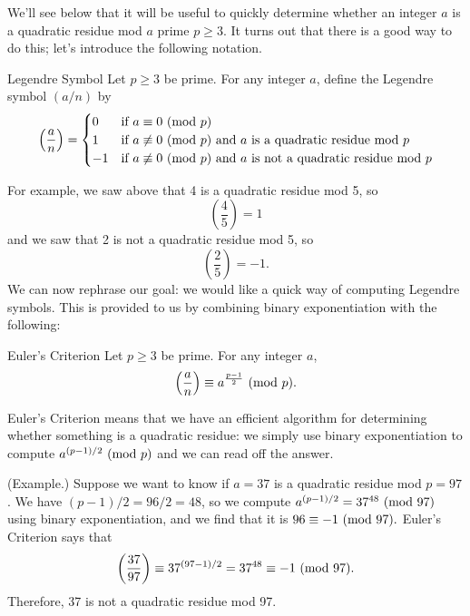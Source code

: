 \documentclass[letterpaper]{article}
\begin{document}
We'll see below that it will be useful to quickly determine whether an integer $a$ is a quadratic residue mod $a$ prime $p \geq 3$. It turns out that there is a good way to do this; let's introduce the following notation. 
\begin{definition}{Legendre Symbol}{}
    Let $p \geq 3$ be prime. For any integer $a$, define the Legendre symbol $(a/n)$ by 
    \[\left(\frac{a}{n}\right) = \begin{cases}
        0 & \text{if } a \equiv 0 \ (\mathrm{mod}\ p) \\ 
        1 & \text{if } a \not\equiv 0 \ (\mathrm{mod}\ p) \text{ and } a \text{ is a quadratic residue mod } p \\ 
        -1 & \text{if } a \not\equiv 0 \ (\mathrm{mod}\ p) \text{ and } a \text{ is not a quadratic residue mod } p
    \end{cases}\]
\end{definition}
For example, we saw above that 4 is a quadratic residue mod 5, so 
\[\left(\frac{4}{5}\right) = 1\]
and we saw that 2 is not a quadratic residue mod 5, so 
\[\left(\frac{2}{5}\right) = -1.\]
We can now rephrase our goal: we would like a quick way of computing Legendre symbols. This is provided to us by combining binary exponentiation with the following: 
\begin{lemma}{Euler's Criterion}{}
    Let $p \geq 3$ be prime. For any integer $a$, 
    \[\left(\frac{a}{n}\right) \equiv a^{\frac{p - 1}{2}} \ (\mathrm{mod}\ p).\]
\end{lemma}

Euler's Criterion means that we have an efficient algorithm for determining whether something is a quadratic residue: we simply use binary exponentiation to compute $a^{(p - 1) / 2} \ (\mathrm{mod}\ p)$ and we can read off the answer. 

\begin{mdframed}
    (Example.) Suppose we want to know if $a = 37$ is a quadratic residue mod $p = 97$. We have $(p - 1) / 2 = 96 / 2 = 48$, so we compute $a^{(p - 1) / 2} = 37^{48} \ (\mathrm{mod}\ 97)$ using binary exponentiation, and we find that it is $96 \equiv -1 \ (\mathrm{mod}\ 97).$ Euler's Criterion says that 
    \[\left(\frac{37}{97}\right) \equiv 37^{(97 - 1) / 2} = 37^{48} \equiv -1 \ (\mathrm{mod}\ 97).\]
    Therefore, 37 is not a quadratic residue mod 97. 
\end{mdframed}
\end{document}

